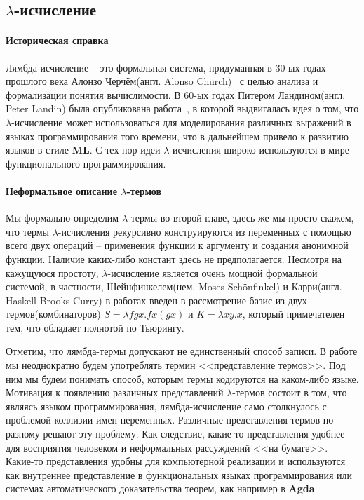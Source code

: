 \subsection{\texorpdfstring{$\lambda$}{Лямбда}-исчисление}
\label{sec:lambda}

\paragraph{Историческая справка}
Лямбда-исчисление -- это формальная система, придуманная в 30-ых годах прошлого века Алонзо Черчём(англ. Alonso Church)~\cite{church1936unsolvable} с целью анализа и формализации понятия вычислимости. В 60-ых годах Питером Ландином(англ. Peter Landin) была опубликована работа~\cite{landin1964mechanical}, в которой выдвигалась идея о том, что $\lambda$-исчисление может использоваться для моделирования различных выражений в языках программирования того времени, что в дальнейшем привело к развитию языков в стиле \textbf{ML}. С тех пор идеи $\lambda$-исчисления широко используются в мире функционального программирования.

\paragraph{Неформальное описание $\lambda$-термов}
Мы формально определим $\lambda$-термы во второй главе, здесь же мы просто скажем, что термы $\lambda$-исчисления рекурсивно конструируются из переменных с помощью всего двух операций -- применения функции к аргументу и создания анонимной функции. Наличие каких-либо констант здесь не предполагается. Несмотря на кажущуюся простоту, $\lambda$-исчисление является очень мощной формальной системой, в частности, Шейнфинкелем(нем. Moses Sch{\"o}nfinkel) и Карри(англ. Haskell Brooks Curry) в работах \cite{schonfinkel1924bausteine, curry1930grundlagen} введен в рассмотрение базис из двух термов(комбинаторов) $S = \lambda f g x. f x (g x)$ и $K = \lambda x y. x$, который примечателен тем, что обладает полнотой по Тьюрингу.

Отметим, что лямбда-термы допускают не единственный способ записи. В работе мы неоднократно будем употреблять термин <<представление термов>>. Под ним мы будем понимать способ, которым термы кодируются на каком-либо языке. Мотивация к появлению различных представлений $\lambda$-термов состоит в том, что являясь языком программирования, лямбда-исчисление само столкнулось с проблемой коллизии имен переменных. Различные представления термов по-разному решают эту проблему. Как следствие, какие-то представления удобнее для восприятия человеком и неформальных рассуждений <<на бумаге>>. Какие-то представления удобны для компьютерной реализации и используются как внутреннее представление в функциональных языках программирования или системах автоматического доказательства теорем, как например в \textbf{Agda}~\cite{norell2007towards}.
